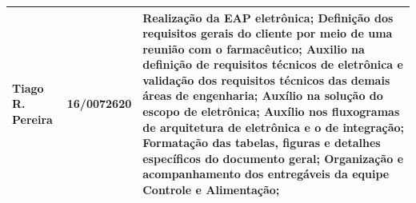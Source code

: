 \begin{apendicesenv}
\begin{table}[H]
\begin{adjustbox}{max width = \textwidth}
\begin{tabular}{|G{4cm}|c|L{10cm}|}
        Tiago R. Pereira & 16/0072620 &   Realização da EAP eletrônica; Definição dos requisitos gerais do cliente por meio de uma reunião com o farmacêutico; Auxilio na definição de requisitos técnicos de eletrônica e validação dos requisitos técnicos das demais áreas de engenharia; Auxílio na solução do escopo de eletrônica; Auxílio nos fluxogramas de arquitetura de eletrônica e o de integração; Formatação das tabelas, figuras e detalhes específicos do documento geral; Organização e acompanhamento dos entregáveis da equipe Controle e Alimentação;  \\ \hline

        \end{tabular}
    \end{adjustbox}
\end{table}



\end{apendicesenv}
